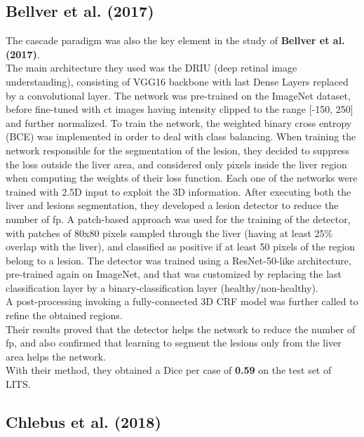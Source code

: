 \subsection*{Bellver et al. (2017)}\label{bellver-et-al.-2017}

The cascade paradigm was also the key element in the study of
\textbf{Bellver et al. (2017)}.\\
The main architecture they used was the DRIU (deep retinal image
understanding), consisting of VGG16 backbone with last Dense Layers
replaced by a convolutional layer. The network was pre-trained on the ImageNet dataset, before fine-tuned
with \ac{ct} images having intensity clipped to the range {[}-150, 250{]} and
further normalized.
To train the network, the weighted binary cross entropy (BCE) was
implemented in order to deal with class balancing. When training the
network responsible for the segmentation of the lesion, they decided to
suppress the loss outside the liver area, and considered only pixels
inside the liver region when computing the weights of their loss
function. Each one of the networks were trained with 2.5D input to
exploit the 3D information.
After executing both the liver and lesions segmentation, they developed
a lesion detector to reduce the number of \ac{fp}. A patch-based approach was
used for the training of the detector, with patches of 80x80 pixels
sampled through the liver (having at least 25\% overlap with the liver),
and classified as positive if at least 50 pixels of the region belong to
a lesion.
The detector was trained using a ResNet-50-like architecture,
pre-trained again on ImageNet, and that was customized by replacing the
last classification layer by a binary-classification layer
(healthy/non-healthy).\\
A post-processing invoking a fully-connected 3D CRF model was further
called to refine the obtained regions.\\
Their results proved that the detector helps the network to reduce the
number of \ac{fp}, and also confirmed that learning to segment the lesions
only from the liver area helps the network.\\
With their method, they obtained a Dice per case of \textbf{0.59} on the
test set of LITS.

\subsection*{Chlebus et al. (2018)}\label{chlebus-et-al.-2018}

